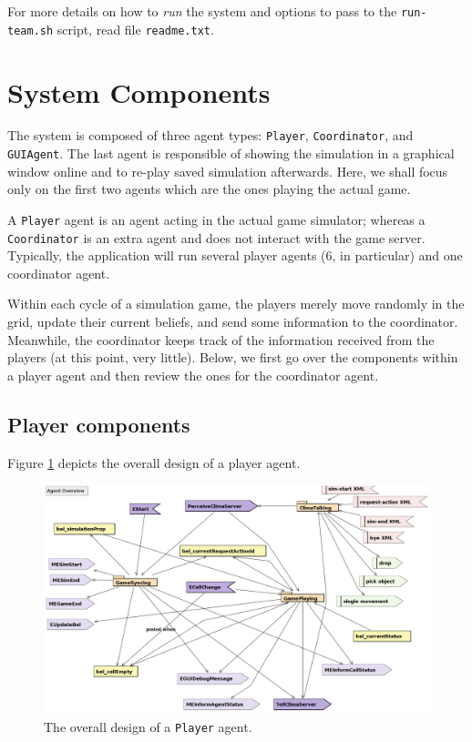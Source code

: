 \documentclass[10pt]{article}
\begin{document}
For more details on how to \textit{run} the system and options to pass to the \texttt{run-team.sh} script, read file \texttt{readme.txt}.


\section{System Components}

The system is composed of three agent types: \texttt{Player}, \texttt{Coordinator}, and \texttt{GUIAgent}. 
%
The last agent is responsible of showing the simulation in a graphical window online and to re-play saved simulation afterwards. Here, we shall focus only on the first two agents which are the ones playing the actual game.

A \texttt{Player} agent is an agent acting in the actual game simulator; whereas a \texttt{Coordinator} is an extra agent and does not interact with the game server. Typically, the application will run several player agents (6, in particular) and one coordinator agent.

Within each cycle of a simulation game, the players merely move randomly in the grid, update their current beliefs, and send some information to the coordinator. Meanwhile, the coordinator keeps track of the information received from the players (at this point, very little).
%
Below, we first go over the components within a player agent and then review the ones for the coordinator agent.

\subsection{Player components}

Figure \ref{fig:player-design} depicts the overall design of a player agent.

\begin{figure}
\begin{center}
\includegraphics[scale=0.35]{player-design}
\end{center}
\caption{The overall design of a \texttt{Player} agent.}
\label{fig:player-design}
\end{figure}
\end{document}
